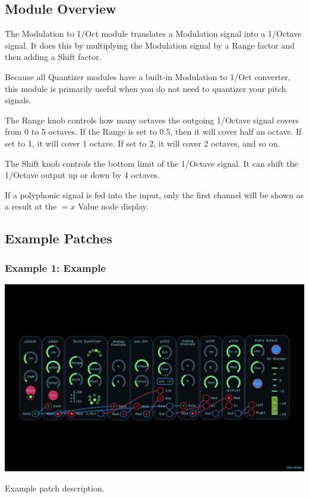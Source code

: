 \documentclass[11pt]{book}
\begin{document}
\begin{multicols*}{2}

\subsection*{Module Overview}

The Modulation to 1/Oct module translates a Modulation signal into a 1/Octave signal. It does this by multiplying the Modulation signal by a Range factor and then adding a Shift factor.

Because all Quantizer modules have a built-in Modulation to 1/Oct converter, this module is primarily useful when you do not need to quantizer your pitch signals.

The Range knob controls how many octaves the outgoing 1/Octave signal covers from 0 to 5 octaves. If the Range is set to 0.5, then it will cover half an octave. If set to 1, it will cover 1 octave. If set to 2, it will cover 2 octaves, and so on.

The Shift knob controls the bottom limit of the 1/Octave signal. It can shift the 1/Octave output up or down by 4 octaves.

If a polyphonic signal is fed into the input, only the first channel will be shown as a result at the $=x$ Value node display. 

\subsection*{Example Patches}

\subsubsection*{Example 1: Example}

\begin{center}
\includegraphics[width=0.95\linewidth]{attenuate-offset-fig4.png}
\end{center}

Example patch description.

\end{multicols*}
\end{document}

